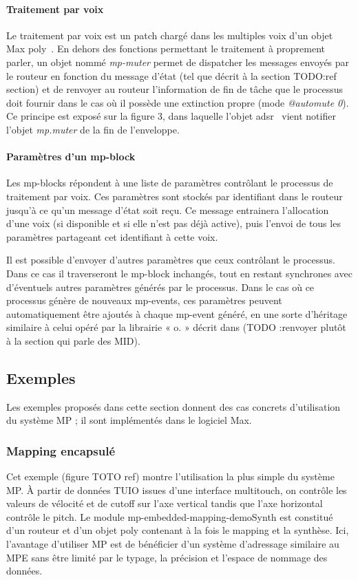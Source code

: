 \paragraph{Traitement par voix}
Le traitement par voix est un patch chargé dans les multiples voix d'un objet Max poly~. En dehors des fonctions permettant le traitement à proprement parler, un objet nommé \textit{mp-muter} permet de dispatcher les messages envoyés par le routeur en fonction du message d'état (tel que décrit à la section TODO:ref section) et de renvoyer au routeur l'information de fin de tâche que le processus doit fournir dans le cas où il possède une extinction propre (mode \textit{@automute 0}). Ce principe est exposé sur la figure 3, dans laquelle l'objet adsr~ vient notifier l'objet \textit{mp.muter} de la fin de l'enveloppe.

\paragraph{Paramètres d'un mp-block}
Les mp-blocks répondent à une liste de paramètres contrôlant le processus de traitement par voix. Ces paramètres sont stockés par identifiant dans le routeur jusqu'à ce qu'un message d'état soit reçu. Ce message entrainera l'allocation d'une voix (si disponible et si elle n'est pas déjà active), puis l'envoi de tous les paramètres partageant cet identifiant à cette voix.
 
Il est possible d'envoyer d'autres paramètres que ceux contrôlant le processus. Dans ce cas il traverseront le mp-block inchangés, tout en restant synchrones avec d'éventuels autres paramètres générés par le processus. Dans le cas où ce processus génère de nouveaux mp-events, ces paramètres peuvent automatiquement être ajoutés à chaque mp-event généré, en une sorte d'héritage similaire à celui opéré par la librairie « o. » décrit dans \cite{goudard_dynamic_2011} (TODO :renvoyer plutôt à la section qui parle des MID).

\subsection{Exemples}
Les exemples proposés dans cette section donnent des cas concrets d'utilisation du système MP ; il sont implémentés dans le logiciel Max.
\subsubsection{Mapping encapsulé}
Cet exemple (figure TOTO ref) montre l'utilisation la plus simple du système MP. À partir de données \gls{TUIO} issues d'une interface multitouch, on contrôle les valeurs de vélocité et de cutoff sur l'axe vertical tandis que l'axe horizontal contrôle le pitch.
Le module mp-embedded-mapping-demoSynth est constitué d'un routeur et d'un objet poly contenant à la fois le mapping et la synthèse. Ici, l'avantage d'utiliser MP est de bénéficier d'un système d'adressage similaire au \gls{MPE} sans être limité par le typage, la précision et l'espace de nommage des données.

